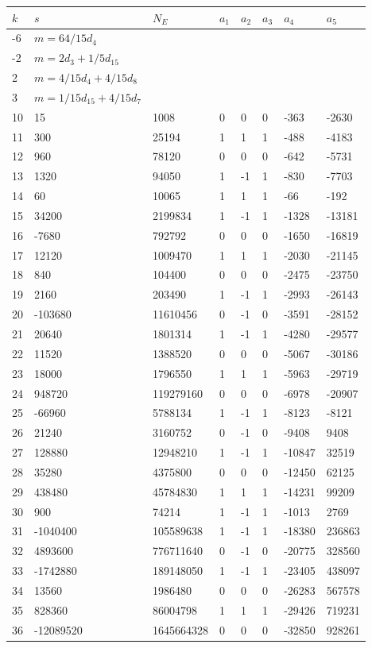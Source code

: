 \documentclass{amsart}
\begin{document}
\begin{longtable}{|l|l|l|lllll|}
\hline
$k$ & $s$ & $N_E$ & $a_1$ & $a_2$ & $a_3$ & $a_4$ & $a_5$\\
\hline
-6&$m=64/15d_{4}$&&\multicolumn{5}{c|}{}\\
-2&$m=2d_{3}+1/5d_{15}$&&\multicolumn{5}{c|}{}\\
2&$m=4/15d_{4}+4/15d_{8}$&&\multicolumn{5}{c|}{}\\
3&$m=1/15d_{15}+4/15d_{7}$&&\multicolumn{5}{c|}{}\\
10&15&1008&0&0&0&-363&-2630\\
11&300&25194&1&1&1&-488&-4183\\
12&960&78120&0&0&0&-642&-5731\\
13&1320&94050&1&-1&1&-830&-7703\\
14&60&10065&1&1&1&-66&-192\\
15&34200&2199834&1&-1&1&-1328&-13181\\
16&-7680&792792&0&0&0&-1650&-16819\\
17&12120&1009470&1&1&1&-2030&-21145\\
18&840&104400&0&0&0&-2475&-23750\\
19&2160&203490&1&-1&1&-2993&-26143\\
20&-103680&11610456&0&-1&0&-3591&-28152\\
21&20640&1801314&1&-1&1&-4280&-29577\\
22&11520&1388520&0&0&0&-5067&-30186\\
23&18000&1796550&1&1&1&-5963&-29719\\
24&948720&119279160&0&0&0&-6978&-20907\\
25&-66960&5788134&1&-1&1&-8123&-8121\\
26&21240&3160752&0&-1&0&-9408&9408\\
27&128880&12948210&1&-1&1&-10847&32519\\
28&35280&4375800&0&0&0&-12450&62125\\
29&438480&45784830&1&1&1&-14231&99209\\
30&900&74214&1&-1&1&-1013&2769\\
31&-1040400&105589638&1&-1&1&-18380&236863\\
32&4893600&776711640&0&-1&0&-20775&328560\\
33&-1742880&189148050&1&-1&1&-23405&438097\\
34&13560&1986480&0&0&0&-26283&567578\\
35&828360&86004798&1&1&1&-29426&719231\\
36&-12089520&1645664328&0&0&0&-32850&928261\\

\end{longtable}
\end{document}
